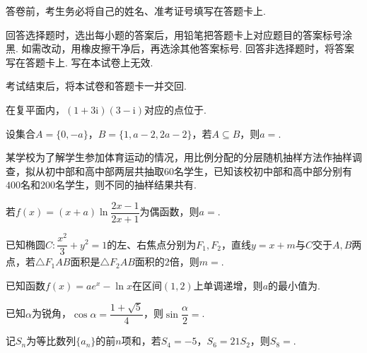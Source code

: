 \documentclass[a4paper,11pt]{report}
\begin{document}
\examfontsize



\noticetitle
\begin{examnotice}
\item 答卷前，考生务必将自己的姓名、准考证号填写在答题卡上. 
\item 回答选择题时，选出每小题的答案后，用铅笔把答题卡上对应题目的答案标号涂黑. 如需改动，用橡皮擦干净后，再选涂其他答案标号. 回答非选择题时，将答案写在答题卡上. 写在本试卷上无效. 
\item 考试结束后，将本试卷和答题卡一并交回. 
\end{examnotice}

\begin{examquestions}
\item 在复平面内，$(1+3\mathrm{i})(3-\mathrm{i})$对应的点位于. 
\item 设集合$A=\{0,-a\}$，$B=\{1,a-2,2a-2\}$，若$A\subseteq B$，则$a=$. 
\item 某学校为了解学生参加体育运动的情况，用比例分配的分层随机抽样方法作抽样调查，拟从初中部和高中部两层共抽取$60$名学生，已知该校初中部和高中部分别有$400$名和$200$名学生，则不同的抽样结果共有. 
\item 若$f(x)=(x+a)\ln\dfrac{2x-1}{2x+1}$为偶函数，则$a=$. 
\item 已知椭圆$C:\dfrac{x^2}{3}+y^2=1$的左、右焦点分别为$F_1,F_2$，直线$y=x+m$与$C$交于$A,B$两点，若$\triangle F_1AB$面积是$\triangle F_2AB$面积的$2$倍，则$m=$. 
\item 已知函数$f(x)=ae^x-\ln x$在区间$(1,2)$上单调递增，则$a$的最小值为. 
\item 已知$\alpha$为锐角，$\cos\alpha=\dfrac{1+\sqrt5}{4}$，则$\sin\dfrac\alpha2=$. 
\item 记$S_n$为等比数列$\{a_n\}$的前$n$项和，若$S_4=-5$，$S_6=21S_2$，则$S_8=$. 
\end{examquestions}
\end{document}
